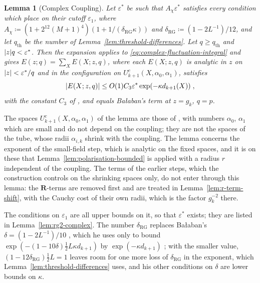 \documentclass[11pt]{preprint}
\DeclarePairedDelimiter{\abs}{\lvert}{\rvert}
\numberwithin{equation}{section}
\newtheorem{lemma}{Lemma}[section]
\theoremstyle{definition}
\theoremstyle{remark}
\theoremstyle{plain}
\begin{document}
\begin{lemma}[Complex Coupling]\label{lem:complex-coupling}
Let $\varepsilon^*$ be such that $A_\chi\varepsilon^*$ satisfies every condition which \cite{BalabanRG1,BalabanRG2} place on their cutoff $\varepsilon_1$, where $A_\chi \coloneqq (1 + 2^{12}(M + 1)^4)(1 + 1/(\delta_{\mathrm{RG}}\kappa))$ and $\delta_{\mathrm{RG}} \coloneqq (1 - 2L^{-1})/12$, and let $q_{\mathrm{th}}$ be the number of Lemma~\ref{lem:threshold-differences}. Let $q \geq q_{\mathrm{th}}$ and $\abs{z}q < \varepsilon^*$. Then the expansion \cite[(2.1)--(2.13), pp.~12--14]{BalabanRG2} applies to \eqref{eq:complex-fluctuation-integral} and gives $E(z; q) = \sum_XE(X; z, q)$, where each $E(X; z, q)$ is analytic in $z$ on $\abs{z} < \varepsilon^*/q$ and in the configuration on $U^c_{k+1}(X, \alpha_0, \alpha_1)$, satisfies
\begin{equation}\label{eq:complex-step-bound}
    \abs{E(X; z, q)} \leq O(1)C_3\varepsilon^*\exp(-\kappa d_{k+1}(X))\;,
\end{equation}
with the constant $C_3$ of \cite[p.~20]{BalabanRG2}, and equals Ba{\l}aban's term at $z = g_k$, $q = p$.
\end{lemma}

The spaces $U^c_{k+1}(X, \alpha_0, \alpha_1)$ of the lemma are those of \cite{BalabanRG1,BalabanRG2}, with numbers $\alpha_0$, $\alpha_1$ which are small and do not depend on the coupling; they are not the spaces of the tube, whose radii $\alpha_{i,k}$ shrink with the coupling. The lemma concerns the exponent \cite[(1.41)]{BalabanRG2} of the small-field step, which is analytic on the fixed spaces, and it is on these that Lemma~\ref{lem:polarisation-bounded} is applied with a radius $r$ independent of the coupling. The terms of the earlier steps, which the construction controls on the shrinking spaces only, do not enter through this lemma: the $\mathbf R$-terms are removed first and are treated in Lemma~\ref{lem:r-term-shift}, with the Cauchy cost of their own radii, which is the factor $g_k^{-2}$ there.

The conditions on $\varepsilon_1$ are all upper bounds on it, so that $\varepsilon^*$ exists; they are listed in Lemma~\ref{lem:rg2-complex}. The number $\delta_{\mathrm{RG}}$ replaces Ba{\l}aban's $\delta = (1 - 2L^{-1})/10$ \cite[p.~21]{BalabanRG2}, which he uses only to bound $\exp(-(1 - 10\delta)\frac12L\kappa d_{k+1})$ by $\exp(-\kappa d_{k+1})$ \cite[(2.41), p.~21]{BalabanRG2}; with the smaller value, $(1 - 12\delta_{\mathrm{RG}})\frac12L = 1$ leaves room for one more loss of $\delta_{\mathrm{RG}}$ in the exponent, which Lemma~\ref{lem:threshold-differences} uses, and his other conditions on $\delta$ are lower bounds on $\kappa$.
\end{document}
